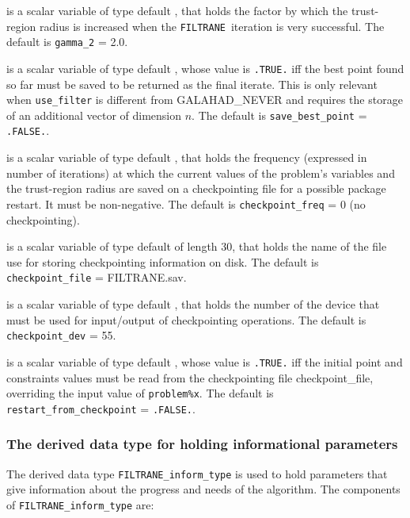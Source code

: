 \documentclass{galahad}
\newcommand{\packagename}{FILTRANE}
\newcommand{\sym}{\sf\small}
\newcommand{\filtrane}{{\tt \packagename}}
\begin{document}
\begin{description}
 is a scalar variable of type default \realdp, that holds the
factor by which the trust-region radius is increased when the \filtrane\
iteration is very successful.
The default is {\tt gamma\_2} = 2.0.

 is a scalar variable of type default \logical, 
whose value is {\tt .TRUE.} iff the best point found so far must be saved to be
returned as the final iterate.  This is only relevant when
{\tt use\_filter} is different from {\sym GALAHAD\_NEVER}
and requires the storage of an additional vector of dimension $n$.
The default is {\tt save\_best\_point} = {\tt .FALSE.}.

 is a scalar variable of type default \integer, that
holds the frequency (expressed in number of iterations) at which
the current values of the problem's variables and the trust-region radius are
saved on a checkpointing file for a possible package restart. It must be
non-negative. 
The default is {\tt checkpoint\_freq} = 0 (no checkpointing).

 is a scalar variable of type default \character of
length 30, that holds the name of the file use for storing checkpointing 
information on disk.
The default is {\tt checkpoint\_file} = FILTRANE.sav.

 is a scalar variable of type default \integer, that
holds the number of the device that must be used for input/output of
checkpointing operations.
The default is {\tt checkpoint\_dev} = 55.

 is a scalar variable of type default \logical,
whose value is {\tt .TRUE.} iff the initial point and constraints values must
be read from the checkpointing file checkpoint\_file,
overriding the input value of {\tt problem\%x}.
The default is {\tt restart\_from\_checkpoint} = {\tt .FALSE.}.

\end{description}


\subsubsection{The derived data type for holding informational
parameters}\label{typeinform}
The derived data type 
{\tt \packagename\_inform\_type} 
is used to hold parameters that give information about the progress and needs 
of the algorithm. The components of 
{\tt \packagename\_inform\_type} 
are:
\end{document}
